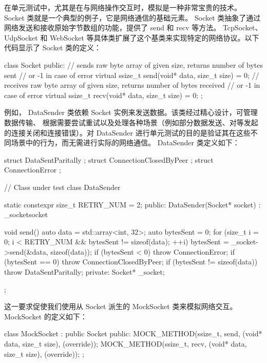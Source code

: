 
在单元测试中，尤其是在与网络操作交互时，模拟是一种非常宝贵的技术。 Socket 类就是一个典型的例子，它是网络通信的基础元素。 Socket 类抽象了通过网络发送和接收原始字节数组的功能，提供了 send 和 recv 等方法。 TcpSocket、 UdpSocket 和 WebSocket 等具体类扩展了这个基类来实现特定的网络协议。以下代码显示了 Socket 类的定义：

\begin{cpp}
class Socket {
    public:
    // sends raw byte array of given size, returns number of bytes sent
    // or -1 in case of error
    virtual ssize_t send(void* data, size_t size) = 0;
    // receives raw byte array of given size, returns number of bytes received
    // or -1 in case of error
    virtual ssize_t recv(void* data, size_t size) = 0;
};
\end{cpp}

例如， DataSender 类依赖 Socket 实例来发送数据。该类经过精心设计，可管理数据传输、 根据需要尝试重试以及处理各种场景（例如部分数据发送、对等发起的连接关闭和连接错误）。对 DataSender 进行单元测试的目的是验证其在这些不同场景中的行为，而无需进行实际的网络通信。 DataSender 类定义如下：

\begin{cpp}
struct DataSentParitally {};
struct ConnectionClosedByPeer {};
struct ConnectionError {};

// Class under test
class DataSender {
    static constexpr size_t RETRY_NUM = 2;
public:
    DataSender(Socket* socket) : _socket{socket} {}

    void send() {
        auto data = std::array<int, 32>{};
        auto bytesSent = 0;
        for (size_t i = 0; i < RETRY_NUM && bytesSent != sizeof(data);
        ++i) {
            bytesSent = _socket->send(&data, sizeof(data));
            if (bytesSent < 0) {
                throw ConnectionError{};
            }
            if (bytesSent == 0) {
            throw ConnectionClosedByPeer{};
            }
        }
        if (bytesSent != sizeof(data)) {
            throw DataSentParitally{};
        }
    }
private:
    Socket* _socket;
};
\end{cpp}

这一要求促使我们使用从 Socket 派生的 MockSocket 类来模拟网络交互。 MockSocket 的定义如下：

\begin{cpp}
class MockSocket : public Socket {
public:
    MOCK_METHOD(ssize_t, send, (void* data, size_t size), (override));
    MOCK_METHOD(ssize_t, recv, (void* data, size_t size), (override));
};
\end{cpp}

